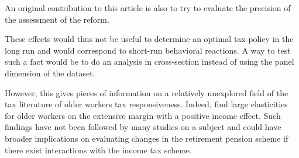 An original contribution to this article is also to try to evaluate the precision of the assessment of the reform.


These effects would thus not be useful to determine an optimal tax policy in the long run and would correspond to short-run behavioral reactions. A way to test such a fact would be to do an analysis in cross-section instead of using the panel dimension of the dataset.

However, this gives pieces of information on a relatively unexplored field of the tax literature of older workers tax responsiveness. Indeed, \citet{alpert2013estimating} find large elasticities for older workers on the extensive margin with a positive income effect. Such findings have not been followed by many studies on a subject and could have broader implications on evaluating changes in the retirement pension scheme if there exist interactions with the income tax scheme.


\newpage

